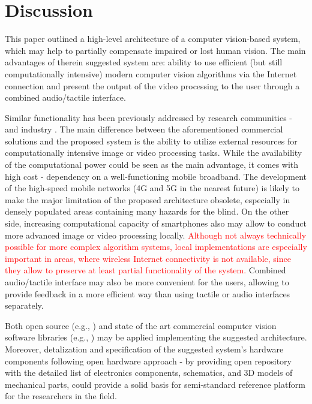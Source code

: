 \documentclass[10pt,conference,compsocconf]{IEEEtran}
\begin{document}
 
\section{Discussion}
\label{sec:discussion}


This paper outlined a high-level architecture of a computer vision-based system, which may help to partially compensate impaired or lost human vision. The main advantages of therein suggested system are: ability to use efficient (but still computationally intensive) modern computer vision algorithms via the Internet connection and present the output of the video processing to the user through a combined audio/tactile interface. 

Similar functionality has been previously addressed by research communities \cite{Caraiman}-\cite{Zientara} and industry \cite{orcam}\cite{horus}. The main difference between the aforementioned commercial solutions and the proposed system is the ability to utilize external resources for computationally intensive image or video processing tasks. While the availability of the computational power could be seen as the main advantage, it comes with high cost - dependency on a well-functioning mobile broadband. The development of the high-speed mobile networks (4G and 5G in the nearest future) is likely to make the major limitation of the proposed architecture obsolete, especially in densely populated areas containing many hazards for the blind. On the other side, increasing computational capacity of smartphones also may allow to conduct more advanced image or video processing locally. \textcolor{red}{Although not always technically possible for more complex algorithm systems, local  implementations are especially important in areas, where wireless Internet connectivity is not available, since they allow to preserve at least partial functionality of the system.} Combined audio/tactile interface may also be more convenient for the users, allowing to provide feedback in a more efficient way than using tactile or audio interfaces separately. 

Both open source (e.g., \cite{Tensorflow}) and state of the art commercial computer vision software libraries (e.g., \cite{Verilook}) may be applied implementing the suggested architecture. Moreover, detalization and specification of the suggested system's hardware components following open hardware approach - by providing open repository with the detailed list of electronics components, schematics, and 3D models of mechanical parts, could provide a solid basis for semi-standard reference platform for the researchers in the field.
\end{document}
